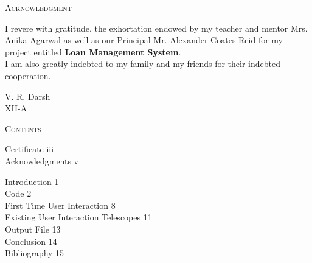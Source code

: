 \documentclass[12pt,a4paper]{article}
\begin{document}
	\newpage
	\thispagestyle{empty}
	
	\begin{large}
		\begin{center}
			
			{\scshape\huge Acknowledgment \par}
			\vspace{1cm}
			
		\end{center}
		
		\normalsize I revere with gratitude, the exhortation endowed by my teacher and mentor Mrs. Anika Agarwal as well as our Principal Mr. Alexander Coates Reid for my project entitled \textbf{Loan Management System}. \\
		I am also greatly indebted to my family and my friends for their indebted cooperation.\\
		
		\vspace{7cm}
		\begin{flushright}
			V. R. Darsh\\
			XII-A
		\end{flushright}
		
	\end{large} 
	
	\newpage
	\thispagestyle{empty}
	
	
	\begin{large}
		
		\begin{center}
			{{\scshape\huge Contents \par}
				\vspace{1cm}}
		\end{center}
		
		\noindent Certificate \hfill iii \\
		Acknowledgments \hfill v \\
		\vspace{0.5cm}
		
		\noindent Introduction \hfill 1\\
		Code \hfill 2\\
		First Time User Interaction \hfill 8\\
		Existing User Interaction Telescopes \hfill 11\\
		Output File \hfill 13\\
		Conclusion \hfill 14\\
		Bibliography \hfill 15\\
		
	\end{large}
	
\end{document}
